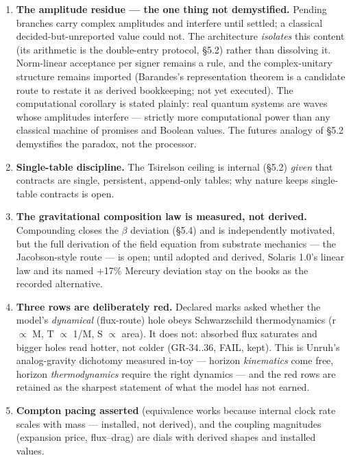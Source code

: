 \documentclass[
  11pt,
]{article}
\providecommand{\tightlist}{%
  \setlength{\itemsep}{0pt}\setlength{\parskip}{0pt}}
\begin{document}
\begin{enumerate}
\def\labelenumi{\arabic{enumi}.}
\tightlist
\item
  \textbf{The amplitude residue --- the one thing not demystified.}
  Pending branches carry complex amplitudes and interfere until settled;
  a classical decided-but-unreported value could not. The architecture
  \emph{isolates} this content (its arithmetic is the double-entry
  protocol, \S{}5.2) rather than dissolving it. Norm-linear acceptance per
  signer remains a rule, and the complex-unitary structure remains
  imported (Barandes's representation theorem is a candidate route to
  restate it as derived bookkeeping; not yet executed). The
  computational corollary is stated plainly: real quantum systems are
  waves whose amplitudes interfere --- strictly more computational power
  than any classical machine of promises and Boolean values. The futures
  analogy of \S{}5.2 demystifies the paradox, not the processor.
\item
  \textbf{Single-table discipline.} The Tsirelson ceiling is internal
  (\S{}5.2) \emph{given} that contracts are single, persistent, append-only
  tables; why nature keeps single-table contracts is open.
\item
  \textbf{The gravitational composition law is measured, not derived.}
  Compounding closes the $\beta$ deviation (\S{}5.4) and is independently
  motivated, but the full derivation of the field equation from
  substrate mechanics --- the Jacobson-style route --- is open; until
  adopted and derived, Solaris 1.0's linear law and its named +17\%
  Mercury deviation stay on the books as the recorded alternative.
\item
  \textbf{Three rows are deliberately red.} Declared marks asked whether
  the model's \emph{dynamical} (flux-route) hole obeys Schwarzschild
  thermodynamics (r $\propto$ M, T $\propto$ 1/M, S $\propto$ area). It does not: absorbed flux
  saturates and bigger holes read hotter, not colder (GR-34..36, FAIL,
  kept). This is Unruh's analog-gravity dichotomy measured in-toy ---
  horizon \emph{kinematics} come free, horizon \emph{thermodynamics}
  require the right dynamics --- and the red rows are retained as the
  sharpest statement of what the model has not earned.
\item
  \textbf{Compton pacing asserted} (equivalence works because internal
  clock rate scales with mass --- installed, not derived), and the
  coupling magnitudes (expansion price, flux--drag) are dials with
  derived shapes and installed values.

\end{enumerate}
\end{document}
